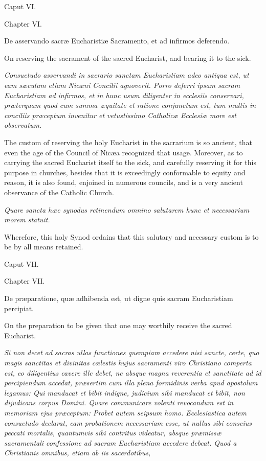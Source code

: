 Caput VI.

Chapter VI.

De asservando sacræ Eucharistiæ Sacramento, et ad infirmos deferendo.

On reserving the sacrament of the sacred Eucharist, and bearing it to the sick.

\emph{Consuetudo asservandi in sacrario sanctam Eucharistiam adeo antiqua est, ut eam sæculum etiam Nicæni Concilii agnoverit. Porro deferri ipsam sacram Eucharistiam ad infirmos, et in hunc usum diligenter in ecclesiis conservari, præterquam quod cum summa æquitate et ratione conjunctum est, tum multis in conciliis præceptum invenitur et vetustissimo Catholicæ Ecclesiæ more est observatum.}

The custom of reserving the holy Eucharist in the sacrarium is so ancient, that even the age of the Council of Nicæa recognized that usage. Moreover, as to carrying the sacred Eucharist itself to the sick, and carefully reserving it for this purpose in churches, besides that it is exceedingly conformable to equity and reason, it is also found, enjoined in numerous councils, and is a very ancient observance of the Catholic Church.

\emph{Quare sancta hæc synodus retinendum omnino salutarem hunc et necessarium morem statuit.}

Wherefore, this holy Synod ordains that this salutary and necessary custom is to be by all means retained.

Caput VII.

Chapter VII.

De præparatione, quæ adhibenda est, ut digne quis sacram Eucharistiam percipiat.

On the preparation to be given that one may worthily receive the sacred Eucharist.

\emph{Si non decet ad sacras ullas functiones quempiam accedere nisi sancte, certe, quo magis sanctitas et divinitas cœlestis hujus sacramenti viro Christiano comperta est, eo diligentius cavere ille debet, ne absque magna reverentia et sanctitate ad id percipiendum accedat, præsertim cum illa plena formidinis verba apud apostolum legamus: Qui manducat et bibit indigne, judicium sibi manducat et bibit, non dijudicans corpus Domini. Quare communicare volenti revocandum est in memoriam ejus præceptum: Probet autem seipsum homo. Ecclesiastica autem consuetudo declarat, eam probationem necessariam esse, ut nullus sibi conscius peccati mortalis, quantumvis sibi contritus videatur, absque præmissæ sacramentali confessione ad sacram Eucharistiam accedere debeat. Quod a Christianis omnibus, etiam ab iis sacerdotibus, }

